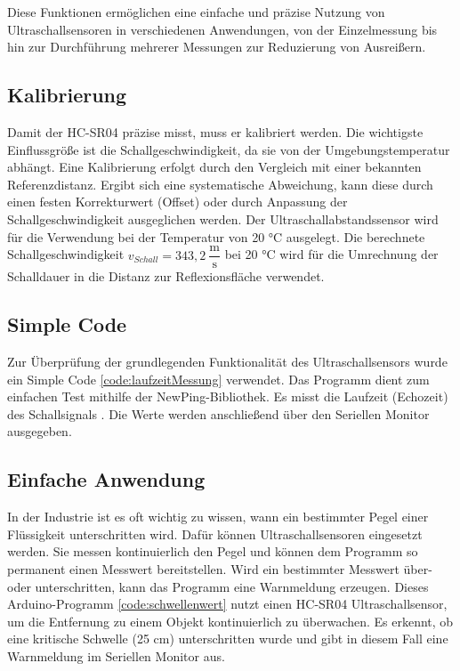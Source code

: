 Diese Funktionen ermöglichen eine einfache und präzise Nutzung von Ultraschallsensoren in verschiedenen Anwendungen, von der Einzelmessung bis hin zur Durchführung mehrerer Messungen zur Reduzierung von Ausreißern.

\subsection{Kalibrierung}
Damit der HC-SR04 präzise misst, muss er kalibriert werden. Die wichtigste Einflussgröße ist die
Schallgeschwindigkeit, da sie von der Umgebungstemperatur abhängt. Eine Kalibrierung erfolgt
durch den Vergleich mit einer bekannten Referenzdistanz. Ergibt sich eine systematische
Abweichung, kann diese durch einen festen Korrekturwert (Offset) oder durch Anpassung der
Schallgeschwindigkeit ausgeglichen werden. \cite{Traenkler:2014}
Der Ultraschallabstandssensor wird für die Verwendung bei der Temperatur von 20 °C ausgelegt. Die  berechnete Schallgeschwindigkeit $v_{Schall}=343,2\:\dfrac{\text{m}}{\text{s}}$ bei 20 °C wird für die Umrechnung der Schalldauer in die Distanz zur Reflexionsfläche verwendet.

\subsection{Simple Code}
Zur Überprüfung der grundlegenden Funktionalität des Ultraschallsensors wurde ein Simple Code \ref{code:laufzeitMessung} verwendet. Das Programm dient zum einfachen Test mithilfe der NewPing-Bibliothek. Es misst die Laufzeit (Echozeit) des Schallsignals	. Die Werte werden anschließend über den Seriellen Monitor ausgegeben.

\begin{code}[H]
	\caption{Einfacher Code zum Testen des Ultraschallsensors}
	\label{code:laufzeitMessung}
\end{code}

\subsection{Einfache Anwendung}
In der Industrie ist es oft wichtig zu wissen, wann ein bestimmter Pegel einer Flüssigkeit unterschritten wird. Dafür können Ultraschallsensoren eingesetzt werden. Sie messen kontinuierlich den Pegel und können dem Programm so permanent einen Messwert bereitstellen. Wird ein bestimmter Messwert über- oder unterschritten, kann das Programm eine Warnmeldung erzeugen.
Dieses Arduino-Programm \ref{code:schwellenwert} nutzt einen HC-SR04 Ultraschallsensor, um die Entfernung zu einem Objekt kontinuierlich zu überwachen. Es erkennt, ob eine kritische Schwelle (25 cm) unterschritten wurde und gibt in diesem Fall eine Warnmeldung im Seriellen Monitor aus.

